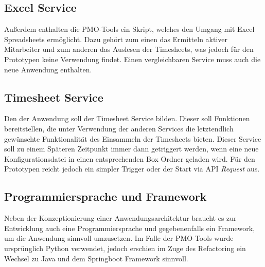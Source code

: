 \subsection{Excel Service}
Außerdem enthalten die PMO-Tools ein \grqq{} Skript, welches den Umgang mit Excel Spreadsheets ermöglicht. Dazu gehört zum einen das Ermitteln aktiver Mitarbeiter und zum anderen das Auslesen der Timesheets, was jedoch für den Prototypen keine Verwendung findet. Einen vergleichbaren Service muss auch die neue Anwendung enthalten.

\subsection{Timesheet Service}
Den \grqq{} der Anwendung soll der Timesheet Service bilden. Dieser soll Funktionen bereitstellen, die unter Verwendung der anderen Services die letztendlich gewünschte Funktionalität des Einsammeln der Timesheets bieten. Dieser Service soll zu einem Späteren Zeitpunkt immer dann getriggert werden, wenn eine neue Konfigurationsdatei in einen entsprechenden Box Ordner geladen wird. Für den Prototypen reicht jedoch ein simpler Trigger oder der Start via \ac{API} \textit{Request} aus.

\subsection{Programmiersprache und Framework}
Neben der Konzeptionierung einer Anwendungsarchitektur braucht es zur Entwicklung auch eine Programmiersprache und gegebenenfalls ein Framework, um die Anwendung sinnvoll umzusetzen. Im Falle der PMO-Tools wurde ursprünglich Python verwendet, jedoch erschien im Zuge des Refactoring ein Wechsel zu Java und dem Springboot Framework sinnvoll.
\pagebreak